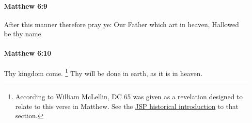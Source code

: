 		\paragraph{Matthew 6:9} %
			\label{MATTHEW-6-9}

			After this manner therefore pray ye: Our Father which art in heaven, Hallowed be thy name.

			\begin{framed}
			\scriptsize
				\begin{compactdesc}
					\item[SBLG] 
				\end{compactdesc}
			\end{framed}

		\paragraph{Matthew 6:10} %
			\label{MATTHEW-6-10}

			Thy kingdom come.%
				\footnote{%
					According to William McLellin, \hyperref[DC65]{DC 65} was given as a revelation designed to relate to this verse in Matthew. See the \hyperref[DC65-HB]{JSP historical introduction} to that section.
					}
			Thy will be done in earth, as it is in heaven.

